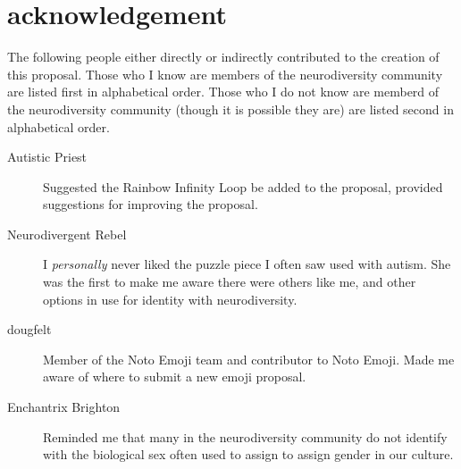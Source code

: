 \section{acknowledgement}

The following people either directly or indirectly contributed to the creation of this
proposal. Those who I know are members of the neurodiversity community are listed first
in alphabetical order. Those who I do not know are memberd of the neurodiversity community
(though it is possible they are) are listed second in alphabetical order.

\begin{description}
  \item[Autistic Priest] Suggested the Rainbow Infinity Loop be added to the proposal, provided suggestions for improving the proposal.
  \item[Neurodivergent Rebel] I \emph{personally} never liked the puzzle piece I often saw used with autism. She was the first to make me aware there were others like me, and other options in use for identity with neurodiversity.
  \item[dougfelt] Member of the Noto Emoji team and contributor to Noto Emoji. Made me aware of where to submit a new emoji proposal.
  \item[Enchantrix Brighton] Reminded me that many in the neurodiversity community do not identify with the biological sex often used to assign to assign gender in our culture.
\end{description}

